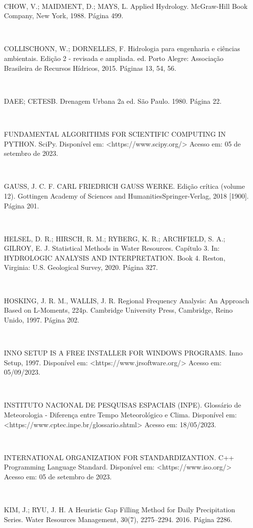 \begin{flushleft}
\

CHOW, V.; MAIDMENT, D.; MAYS, L. Applied Hydrology. McGraw-Hill Book Company, New York, 1988. Página 499.

\

COLLISCHONN, W.; DORNELLES, F. Hidrologia para engenharia e ciências ambientais. Edição 2 - revisada e ampliada. ed. Porto Alegre: Associação Brasileira de Recursos Hídricos, 2015. Páginas 13, 54, 56.

\

DAEE; CETESB. Drenagem Urbana 2a ed. São Paulo. 1980. Página 22.

\

FUNDAMENTAL ALGORITHMS FOR SCIENTIFIC COMPUTING IN PYTHON. SciPy. Disponível em: <https://www.scipy.org/> Acesso em: 05 de setembro de 2023.

\newpage

\

GAUSS, J. C. F. CARL FRIEDRICH GAUSS WERKE. Edição crítica (volume 12). Gottingen Academy of Sciences and HumanitiesSpringer-Verlag, 2018 [1900]. Página 201.

\

HELSEL, D. R.; HIRSCH, R. M.; RYBERG, K. R.; ARCHFIELD, S. A.; GILROY, E. J. Statistical Methods in Water Resources. Capítulo 3. In: HYDROLOGIC ANALYSIS AND INTERPRETATION. Book 4. Reston, Virginia: U.S. Geological Survey, 2020. Página 327.

\

HOSKING, J. R. M., WALLIS, J. R. Regional Frequency Analysis: An Approach Based on L-Moments, 224p. Cambridge University Press, Cambridge, Reino Unido, 1997. Página 202.

\

INNO SETUP IS A FREE INSTALLER FOR WINDOWS PROGRAMS. Inno Setup, 1997. Disponível em: <https://www.jrsoftware.org/> Acesso em: 05/09/2023.

\

INSTITUTO NACIONAL DE PESQUISAS ESPACIAIS (INPE). Glossário de Meteorologia - Diferença entre Tempo Meteorológico e Clima. Disponível em: <https://www.cptec.inpe.br/glossario.shtml> Acesso em: 18/05/2023.

\

INTERNATIONAL ORGANIZATION FOR STANDARDIZANTION. C++ Programming Language Standard. Disponível em: <https://www.iso.org/> Acesso em: 05 de setembro de 2023.

\

KIM, J.; RYU, J. H. A Heuristic Gap Filling Method for Daily Precipitation Series. Water Resources Management, 30(7), 2275–2294. 2016. Página 2286.


\end{flushleft}
